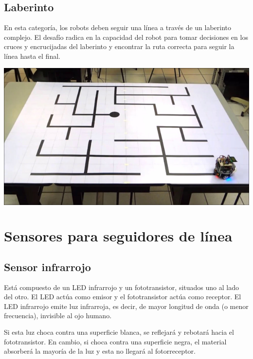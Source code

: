 \documentclass[a4paper,11pt]{report}    %
\begin{document}
\subsection{Laberinto}

\begin{minipage}{0.4\textwidth}
    En esta categoría, los robots deben seguir una línea a través de un laberinto complejo. El desafío radica en la capacidad del robot para tomar decisiones en los cruces y encrucijadas del laberinto y encontrar la ruta correcta para seguir la línea hasta el final.


\end{minipage}
\hfill
\begin{minipage}{0.5\textwidth}
    \includegraphics[width=\linewidth]{img/image5.png}
\end{minipage}

\section{Sensores para seguidores de línea}

\subsection{Sensor infrarrojo}

Está compuesto de un LED infrarrojo y un fototransistor, situados uno al lado del otro. El LED actúa como emisor y el fototransistor actúa como receptor. El LED infrarrojo emite luz infrarroja, es decir, de mayor longitud de onda (o menor frecuencia), invisible al ojo humano. 

Si esta luz choca contra una superficie blanca, se reflejará y rebotará hacia el fototransistor. En cambio, si choca contra una superficie negra, el material absorberá la mayoría de la luz y esta no llegará al fotorreceptor.
\end{document}
